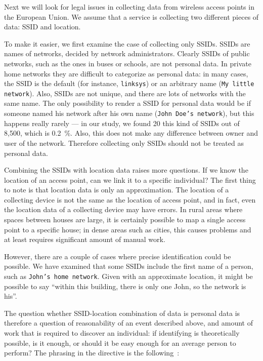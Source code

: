 \documentclass[12pt,a4paper,oneside,pdftex]{report}
\begin{document}
Next we will look for legal issues in collecting data from wireless access points in the European Union. We assume that a service is collecting two different pieces of data: SSID and location.

To make it easier, we first examine the case of collecting only SSIDs. SSIDs are names of networks, decided by network administrators. Clearly SSIDs of public networks, such as the ones in buses or schools, are not personal data. In private home networks they are difficult to categorize as personal data: in many cases, the SSID is the default (for instance, \texttt{linksys}) or an arbitrary name (\texttt{My little network}). Also, SSIDs are not unique, and there are lots of networks with the same name. The only possibility to render a SSID for personal data would be if someone named his network after his own name (\texttt{John Doe's network}), but this happens really rarely --- in our study, we found 20 this kind of SSIDs out of 8,500, which is 0.2~\%. Also, this does not make any difference between owner and user of the network. Therefore collecting only SSIDs should not be treated as personal data.

Combining the SSIDs with location data raises more questions. If we know the location of an access point, can we link it to a specific individual? The first thing to note is that location data is only an approximation. The location of a collecting device is not the same as the location of access point, and in fact, even the location data of a collecting device may have errors. In rural areas where spaces between houses are large, it is certainly possible to map a single access point to a specific house; in dense areas such as cities, this causes problems and at least requires significant amount of manual work.

However, there are a couple of cases where precise identification could be possible. We have examined that some SSIDs include the first name of a person, such as \texttt{John's home network}. Given with an approximate location, it might be possible to say ``within this building, there is only one John, so the network is his''. 

The question whether SSID-location combination of data is personal data is therefore a question of reasonability of an event described above, and amount of work that is required to discover an individual: if identifying is theoretically possible, is it enough, or should it be easy enough for an average person to perform? The phrasing in the directive is the following~\cite{data_protection}:
\end{document}

